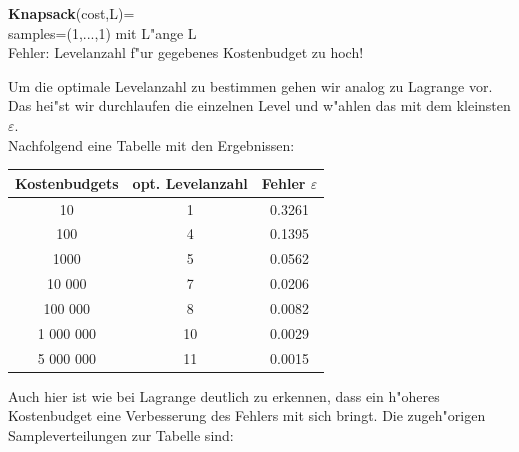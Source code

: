 \begin{algorithm}[H]
\textbf{Knapsack}(cost,L)=\\
samples=(1,...,1) mit L"ange L\\
{Fehler: Levelanzahl f"ur gegebenes Kostenbudget zu hoch!}


\caption{Algorithmus f"ur optimale Sampleanzahl mit der Umverteil-Methode}
\end{algorithm}\vspace{0,3cm}
Um die optimale Levelanzahl zu bestimmen gehen wir analog zu Lagrange vor. Das hei"st wir durchlaufen die einzelnen Level und w"ahlen das mit dem kleinsten $\varepsilon$.\\
Nachfolgend eine Tabelle mit den Ergebnissen:\\
\begin{center}
\begin{tabular}{|c|c|c|}
Kostenbudgets & opt. Levelanzahl & Fehler $\varepsilon$ \\
 \hline
10 & 1 & 0.3261 \\
\hline
100& 4 & 0.1395 \\
\hline
1000& 5 &  0.0562 \\
\hline
10 000& 7 & 0.0206 \\
\hline
100 000& 8 & 0.0082 \\
\hline
1 000 000& 10 &   0.0029 \\
\hline
5 000 000& 11 & 0.0015
 \\
\end{tabular}
\end{center}
Auch hier ist wie bei Lagrange deutlich zu erkennen, dass ein h"oheres Kostenbudget  eine Verbesserung des Fehlers mit sich bringt. 
Die zugeh"origen Sampleverteilungen zur Tabelle sind:
